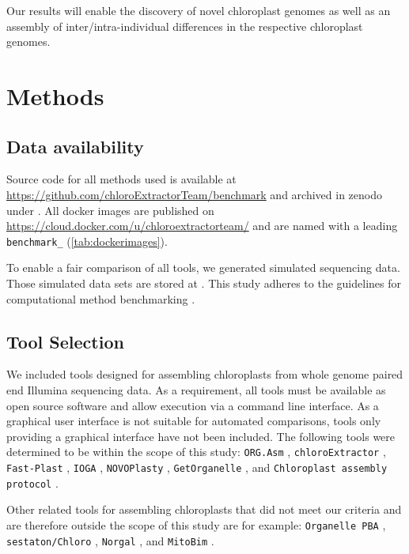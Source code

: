 \documentclass{bmcart}
\newcommand{\formatprogramnames}[1]{\texttt{#1}}
\newcommand{\ce}{\formatprogramnames{chloroExtractor}}
\newcommand{\oa}{\formatprogramnames{ORG.Asm}}
\newcommand{\fp}{\formatprogramnames{Fast-Plast}}
\newcommand{\ioga}{\formatprogramnames{IOGA}}
\newcommand{\np}{\formatprogramnames{NOVOPlasty}}
\newcommand{\go}{\formatprogramnames{GetOrganelle}}
\newcommand{\cassp}{\formatprogramnames{Chloroplast assembly protocol}}
\newcommand{\zenododataset}{\cite{zenododataset}}
\newcommand{\zenodorepo}{\cite{zenodorepo}}
\begin{document}
Our results will enable the discovery of novel chloroplast genomes as well as an assembly of inter/intra-individual differences in the respective chloroplast genomes.  

\section*{Methods}
\subsection*{Data availability}
Source code for all methods used is available at \url{https://github.com/chloroExtractorTeam/benchmark} and archived in zenodo under \zenodorepo{}.
All docker images are published on \url{https://cloud.docker.com/u/chloroextractorteam/} and are named with a leading \texttt{benchmark\_} (\cref{tab:dockerimages}).

To enable a fair comparison of all tools, we generated simulated sequencing data.
Those simulated data sets are stored at \zenododataset{}.
This study adheres to the guidelines for computational method benchmarking \cite{weber_essential_2018}.

\subsection*{Tool Selection}
We included tools designed for assembling chloroplasts from whole genome paired end Illumina sequencing data. As a requirement, all tools must be available as open source software and allow execution via a command line interface. 
As a graphical user interface is not suitable for automated comparisons, tools only providing a graphical interface have not been included.
The following tools were determined to be within the scope of this study:
\oa{} \cite{coissac_barcodes_2016}, 
\ce{} \cite{j_ankenbrand_chloroextractor:_2018}, 
\fp{} \cite{mckain__fast-plast_2017}, 
\ioga{} \cite{bakker_herbarium_2016}, 
\np{} \cite{dierckxsens_novoplasty:_2017}, 
\go{} \cite{jin_getorganelle:_2018}, and
\cassp{} \cite{sancho_comparative_2018}.

Other related tools for assembling chloroplasts that did not meet our criteria and are therefore outside the scope of this study are for example:
\texttt{Organelle PBA} \cite{Soorni2017}, \texttt{sestaton/Chloro} \cite{sestaton}, \texttt{Norgal}  \cite{Al-Nakeeb2017}, and \texttt{MitoBim} \cite{mitobim2013}.
\end{document}

